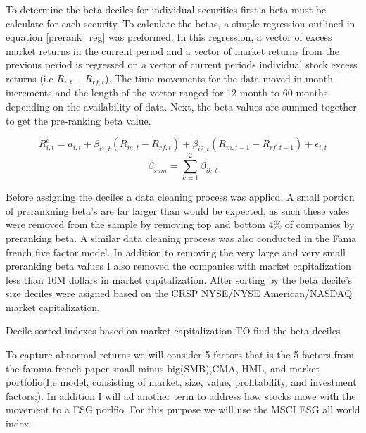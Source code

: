 \documentclass[12pt,oneside,reqno]{amsart}
\begin{document}
To determine the beta deciles for individual securities first a beta must be calculate for each security. To calculate the betas, a  simple regression outlined in equation \eqref{prerank_reg} was preformed. In this regression, a vector of  excess market returns in the current period and a vector of market returns from the previous period is regressed on a vector of current periods individual stock excess returns (i.e $R_{i,t}-R_{rf,t}$). The time movements for the data moved in month increments and the length of the vector ranged for 12 month to 60 months depending on the availability of data. Next, the beta values are summed together to get the pre-ranking beta value. 

\begin{equation}
    R_{i,t}^e = a_{i,t} + \beta_{i1,t}(R_{m,t}-R_{rf,t})+\beta_{i2,t}(R_{m,t-1}-R_{rf,t-1})+\epsilon_{i,t}
    \label{prerank_reg}
\end{equation}
\begin{equation}
    \beta_{sum} = \sum_{k=1}^2\beta_{ik,t}
\end{equation}


Before assigning the deciles a data cleaning process was applied. A small portion of prerankning beta's are far larger than would be expected, as such these vales were removed from the sample by removing top and bottom 4\% of companies by preranking beta. A similar data cleaning process was also conducted in the Fama french five factor model. In addition to removing the very large and very small preranking beta values I also removed the companies with market capitalization less than 10M dollars in market capitalization. After sorting by the beta decile's size deciles were asigned based on the CRSP NYSE/NYSE American/NASDAQ market capitalization.




Decile-sorted indexes based on
market capitalization
TO find the beta deciles 


To capture abnormal returns we will consider 5 factors that is the 5 factors from the famma french paper small minus big(SMB),CMA, HML, and market portfolio(I.e model, consisting of market, size, value, profitability, and investment factors;). In addition I will ad another term to address how stocks move with the movement to a ESG porlfio. For this purpose we will use the MSCI ESG all world index. 
\end{document}
